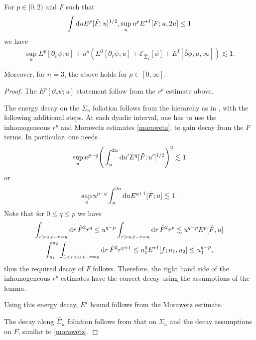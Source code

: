 \documentclass[11pt, oneside]{amsart}
\begin{document}
\begin{lemma}\label{energy decay p<2}
	
	For $p\in[0,2)$ and $F$ such that
	\begin{equation*}
		\begin{gathered}
			\int\mathrm{d} u E^{p}[\tilde{F};u]^{1/2},\sup_uu^pE^{\star I}[F;u,2u]\leq1
		\end{gathered}
	\end{equation*}
	we have
	\begin{equation*}
		\begin{gathered}
			\sup_u E^p[\partial_v\psi;u]+ u^p(E^0[\partial_v\psi;u]+\mathcal{E}_{\hat{\Sigma}_u}[\phi]+E^{I}[\overline{\partial}\phi;u,\infty])\lesssim1.
		\end{gathered}
	\end{equation*}
	
	Moreover, for $n=3$, the above holds for $p\in[0,\infty]$.
\end{lemma}
\begin{proof}
	The $E^p[\partial_v\psi;u]$ statement follow from the $r^p$ estimate above.
	
	The energy decay on the $\Sigma_u$ foliation follows from the hierarchy as in \cite{yang_global_2013-1}, with the following additional steps. At each dyadic interval, one has to use the inhomogeneous $r^p$ and Morawetz estimates \cref{morawetz}, to gain decay from the $F$ terms. In particular, one needs 
	\begin{equation*}
		\begin{gathered}
			\sup_u u^{p-q}\Bigg(\int_u^{2u}\mathrm{d} u' E^{q}[\tilde{F};u']^{1/2}\Bigg)^2\lesssim1	
		\end{gathered}
	\end{equation*}
	or
	\begin{equation*}
		\begin{gathered}
			\sup_u u^{p-q}\int_u^{2u}\mathrm{d} u E^{q+1}[\tilde{F};u]\lesssim1.
		\end{gathered}
	\end{equation*}
	Note that for $0\leq q\leq p$ we have
	\begin{equation*}
		\begin{gathered}
			\int_{r>u,t-r=u}\mathrm{d} r \,\tilde{F}^2r^q\leq u^{q-p}\int_{r>u,t-r=u}\mathrm{d} r \, \tilde{F}^2r^p\lesssim u^{q-p}E^p[\tilde{F},u]\\
			\int_{u_1}^{u_2}\int_{1<r<u,t-r=u}\mathrm{d} r\,\tilde{F}^2r^{q+1}\leq u_1^q E^{\star I}[f;u_1,u_2]\leq u_1^{q-p},
		\end{gathered}
	\end{equation*}
	thus the required decay of $F$ follows. Therefore, the right hand side of the inhomogeneous $r^p$ estimates have the correct decay using the assumptions of the lemma.
	
	Using this energy decay, $E^I$ bound follows from the Morawetz estimate.
	
	The decay along $\hat{\Sigma}_u$ foliation follows from that on $\Sigma_u$ and the decay assumptions on $F$, similar to \cref{morawetz}.
\end{proof}
\end{document}
